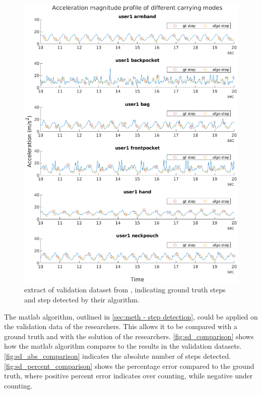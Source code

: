 \begin{figure}
	\centering
	\includegraphics[width=\linewidth]{images/20200929_0951_gt_steps_vs_salvi_steps}
	\caption{extract of validation dataset from \citet{Salvi2018}, indicating ground truth steps and step detected by their algorithm.}
	\label{fig:gt_steps_vs_salvi_steps}
\end{figure}


The matlab algorithm, outlined in \cref{sec:meth - step detection}, could be applied on the validation data of the researchers. This allows it to be compared with a ground truth and with the solution of the researchers. \cref{fig:sd_comparison} shows how the matlab algorithm compares to the results in the validation datasets. \cref{fig:sd_abs_comparison} indicates the absolute number of steps detected. \cref{fig:sd_percent_comparison}  shows the percentage error compared to the ground truth, where  
positive percent error indicates over counting, while negative under counting. 

